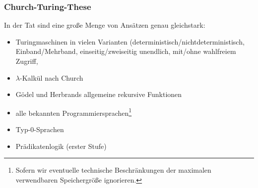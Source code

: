\documentclass[aspectratio=1610,onlymath]{beamer}
\begin{document}
\begin{frame}

\end{frame}

\begin{frame}\frametitle{Church-Turing-These}


In der Tat sind eine große Menge von Ansätzen genau gleichstark:
\begin{itemize}
\item Turingmaschinen in vielen Varianten (deterministisch/nichtdeterministisch, Einband/Mehrband,
einseitig/zweiseitig unendlich, mit/ohne wahlfreiem Zugriff, \ghost{\ldots)}
\item $\lambda$-Kalkül nach Church
\item Gödel und Herbrands allgemeine rekursive Funktionen
\item alle bekannten Programmiersprachen\footnote{Sofern wir eventuelle technische Beschränkungen der maximalen verwendbaren Speichergröße ignorieren.}
\item Typ-0-Sprachen
\item Prädikatenlogik (erster Stufe)
\end{itemize}

\end{frame}

\end{document}
